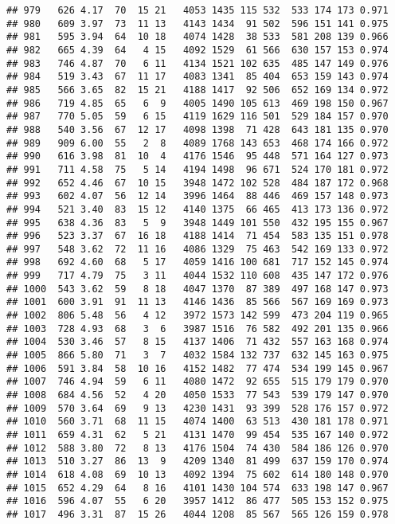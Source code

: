 \documentclass[]{article}
\begin{document}
\begin{verbatim}
## 979   626 4.17  70  15 21   4053 1435 115 532  533 174 173 0.971
## 980   609 3.97  73  11 13   4143 1434  91 502  596 151 141 0.975
## 981   595 3.94  64  10 18   4074 1428  38 533  581 208 139 0.966
## 982   665 4.39  64   4 15   4092 1529  61 566  630 157 153 0.974
## 983   746 4.87  70   6 11   4134 1521 102 635  485 147 149 0.976
## 984   519 3.43  67  11 17   4083 1341  85 404  653 159 143 0.974
## 985   566 3.65  82  15 21   4188 1417  92 506  652 169 134 0.972
## 986   719 4.85  65   6  9   4005 1490 105 613  469 198 150 0.967
## 987   770 5.05  59   6 15   4119 1629 116 501  529 184 157 0.970
## 988   540 3.56  67  12 17   4098 1398  71 428  643 181 135 0.970
## 989   909 6.00  55   2  8   4089 1768 143 653  468 174 166 0.972
## 990   616 3.98  81  10  4   4176 1546  95 448  571 164 127 0.973
## 991   711 4.58  75   5 14   4194 1498  96 671  524 170 181 0.972
## 992   652 4.46  67  10 15   3948 1472 102 528  484 187 172 0.968
## 993   602 4.07  56  12 14   3996 1464  88 446  469 157 148 0.973
## 994   521 3.40  83  15 12   4140 1375  66 465  413 173 136 0.972
## 995   638 4.36  83   5  9   3948 1449 101 550  432 195 155 0.967
## 996   523 3.37  67  16 18   4188 1414  71 454  583 135 151 0.978
## 997   548 3.62  72  11 16   4086 1329  75 463  542 169 133 0.972
## 998   692 4.60  68   5 17   4059 1416 100 681  717 152 145 0.974
## 999   717 4.79  75   3 11   4044 1532 110 608  435 147 172 0.976
## 1000  543 3.62  59   8 18   4047 1370  87 389  497 168 147 0.973
## 1001  600 3.91  91  11 13   4146 1436  85 566  567 169 169 0.973
## 1002  806 5.48  56   4 12   3972 1573 142 599  473 204 119 0.965
## 1003  728 4.93  68   3  6   3987 1516  76 582  492 201 135 0.966
## 1004  530 3.46  57   8 15   4137 1406  71 432  557 163 168 0.974
## 1005  866 5.80  71   3  7   4032 1584 132 737  632 145 163 0.975
## 1006  591 3.84  58  10 16   4152 1482  77 474  534 199 145 0.967
## 1007  746 4.94  59   6 11   4080 1472  92 655  515 179 179 0.970
## 1008  684 4.56  52   4 20   4050 1533  77 543  539 179 147 0.970
## 1009  570 3.64  69   9 13   4230 1431  93 399  528 176 157 0.972
## 1010  560 3.71  68  11 15   4074 1400  63 513  430 181 178 0.971
## 1011  659 4.31  62   5 21   4131 1470  99 454  535 167 140 0.972
## 1012  588 3.80  72   8 13   4176 1504  74 430  584 186 126 0.970
## 1013  510 3.27  86  13  9   4209 1340  81 499  637 159 170 0.974
## 1014  618 4.08  69  10 13   4092 1394  75 602  614 180 148 0.970
## 1015  652 4.29  64   8 16   4101 1430 104 574  633 198 147 0.967
## 1016  596 4.07  55   6 20   3957 1412  86 477  505 153 152 0.975
## 1017  496 3.31  87  15 26   4044 1208  85 567  565 126 159 0.978

\end{verbatim}
\end{document}
